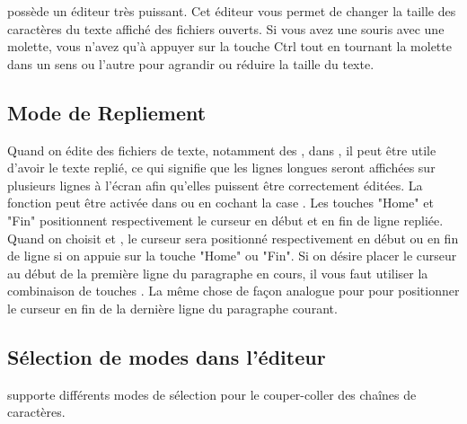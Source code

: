 \codeblocks possède un éditeur très puissant. Cet éditeur vous permet de changer la taille des caractères du texte affiché des fichiers ouverts. Si vous avez une souris avec une molette, vous n'avez qu'à appuyer sur la touche Ctrl tout en tournant la molette dans un sens ou l'autre pour agrandir ou réduire la taille du texte.


\subsection{Mode de Repliement}

Quand on édite des fichiers de texte, notamment des , dans \codeblocks, il peut être utile d'avoir le texte replié, ce qui signifie que les lignes longues seront affichées sur plusieurs lignes à l'écran afin qu'elles puissent être correctement éditées. La fonction  peut être activée dans  ou en cochant la case . Les touches "Home" et "Fin" positionnent respectivement le curseur en début et en fin de ligne repliée. Quand on choisit  et , le curseur sera positionné respectivement en début ou en fin de ligne si on appuie sur la touche "Home" ou "Fin". Si on désire placer le curseur au début de la première ligne du paragraphe en cours, il vous faut utiliser la combinaison de touches . La même chose de façon analogue pour  pour positionner le curseur en fin de la dernière ligne du paragraphe courant.

\subsection{Sélection de modes dans l'éditeur}

\codeblocks supporte différents modes de sélection pour le couper-coller des chaînes de caractères.

